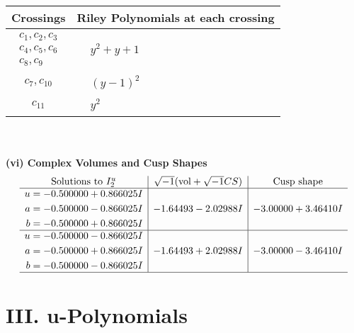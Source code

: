 \documentclass[1p]{elsarticle_modified}
\theoremstyle{definition}
\newcommand{\I}{\sqrt{-1}}
\begin{document}
\begin{tabular}{m{50pt}|m{274pt}}
Crossings & \hspace{64pt}Riley Polynomials at each crossing \\
\hline $$\begin{aligned}c_{1},c_{2},c_{3}\\c_{4},c_{5},c_{6}\\c_{8},c_{9}\end{aligned}$$&$\begin{aligned}
&y^2+y+1
\end{aligned}$\\
\hline $$\begin{aligned}c_{7},c_{10}\end{aligned}$$&$\begin{aligned}
&(y-1)^2
\end{aligned}$\\
\hline $$\begin{aligned}c_{11}\end{aligned}$$&$\begin{aligned}
&y^2
\end{aligned}$\\
\hline
\end{tabular}\\~\\
\newpage\flushleft \textbf{(vi) Complex Volumes and Cusp Shapes}
$$\begin{array}{c|c|c}  
\text{Solutions to }I^u_{2}& \I (\text{vol} + \sqrt{-1}CS) & \text{Cusp shape}\\
 \hline 
\begin{aligned}
u &= -0.500000 + 0.866025 I \\
a &= -0.500000 - 0.866025 I \\
b &= -0.500000 + 0.866025 I\end{aligned}
 & -1.64493 - 2.02988 I & -3.00000 + 3.46410 I \\ \hline\begin{aligned}
u &= -0.500000 - 0.866025 I \\
a &= -0.500000 + 0.866025 I \\
b &= -0.500000 - 0.866025 I\end{aligned}
 & -1.64493 + 2.02988 I & -3.00000 - 3.46410 I\\
 \hline 
 \end{array}$$\newpage
\newpage\renewcommand{\arraystretch}{1}
\centering \section*{ III. u-Polynomials}
\end{document}
